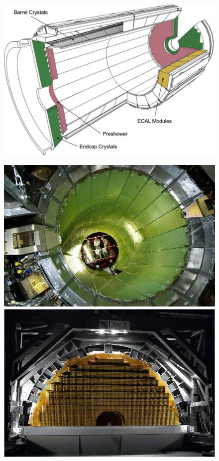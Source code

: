 \begin{figure}[htbp]
	\centering
	\begin{minipage}{0.5\textwidth}
		\includegraphics[width=\textwidth]{2_ExperimentalSetup/Figures/imageedit_5_8264930617}
	\end{minipage}
\begin{minipage}{0.39\textwidth}
	\includegraphics[width=\textwidth]{2_ExperimentalSetup/Figures/ECAL}
	\includegraphics[width=\textwidth]{2_ExperimentalSetup/Figures/EE-in-frame}

\end{minipage}
\end{figure}
